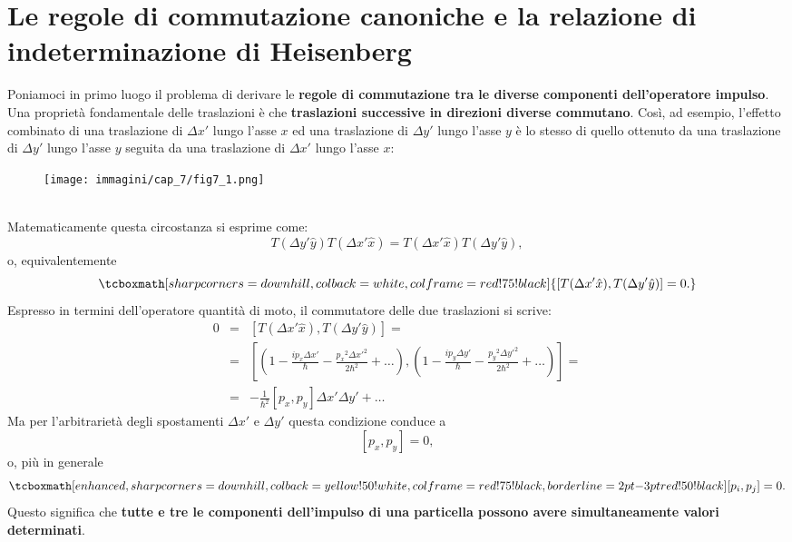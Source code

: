 \section[Le regole di commutazione canoniche e la relazione di indeterminazione di Heisenberg]{Le regole di commutazione canoniche e la relazione di indeterminazione di Heisenberg}
Poniamoci in primo luogo il problema di derivare le \textbf{regole di commutazione tra le diverse componenti dell'operatore impulso}.\\
Una proprietà fondamentale delle traslazioni è che \textbf{traslazioni successive in direzioni diverse commutano}. Così, ad esempio, l'effetto combinato di una traslazione di $\Delta x'$ lungo l'asse $x$ ed una traslazione di $\Delta y'$ lungo l'asse $y$ è lo stesso di quello ottenuto da una traslazione di $\Delta y'$ lungo l'asse $y$ seguita da una traslazione di $\Delta x'$ lungo l'asse $x$:\\
\begin{figure}[!htbp]
\begin{center}
\texttt{[image: immagini/cap\_7/fig7\_1.png]}
\end{center}
\end{figure}\\
Matematicamente questa circostanza si esprime come:
	\begin{equation}
		T(\Delta y'\hat{y})T(\Delta x'\hat{x})= T(\Delta x'\hat{x})T(\Delta y'\hat{y}),
	\end{equation}
o, equivalentemente
	\begin{equation}
		\tcboxmath[sharp corners=downhill ,colback=white,colframe=red!75!black]{
			\left[ T(\Delta x'\hat{x}), T(\Delta y'\hat{y})\right] =0.
			}
	\end{equation}
Espresso in termini dell'operatore quantità di moto, il commutatore delle due traslazioni si scrive:
	\begin{eqnarray}
		0 & = & \left[ T(\Delta x'\hat{x}), T(\Delta y'\hat{y})\right] =   \nonumber \\
		 & = & \left[\left( 1-\frac{i p_x \Delta x'}{\hbar}-\frac{ {p_x} ^2 {\Delta x'}^2}{2\hbar ^2}+\dots \right), \left( 1-\frac{i p_y \Delta y'}{\hbar}-\frac{ {p_y} ^2 {\Delta y'}^2}{2\hbar ^2}+\dots\right) \right] = \nonumber  \\
		& = & -\frac{1}{\hbar ^2}\left[p_x, p_y \right]\Delta x' \Delta y' + \dots
	\end{eqnarray}
Ma per l'arbitrarietà degli spostamenti $\Delta x'$ e  $\Delta y'$ questa condizione conduce a
	\begin{equation}
		\left[p_x , p_y\right] =0,
	\end{equation}
o, più in generale
	\begin{equation}
		\tcboxmath[enhanced,sharp corners=downhill ,colback=yellow!50!white,colframe=red!75!black, borderline={2pt}{-3pt}{red!50!black}]{
			\left[p_i , p_j\right] =0.
			}
	\end{equation}
Questo significa che \textbf{tutte e tre le componenti dell'impulso di una particella possono avere simultaneamente valori determinati}.\\


